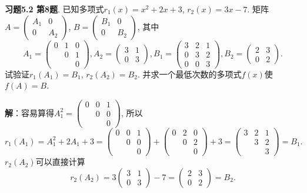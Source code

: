 \newpageorvspace


{\bf 习题5.2 第8题}. 已知多项式$r_1(x) = x^2+2x+3$, $r_2(x) = 3x-7$. 矩阵$A = \begin{pmatrix} A_1 & 0 \\ 0 & A_2 \end{pmatrix}$, $B = \begin{pmatrix} B_1 & 0 \\ 0 & B_2 \end{pmatrix}$, 其中
$$A_1 = \begin{pmatrix} 0 & 1 & 0 \\ & 0 & 1 \\ & & 0 \end{pmatrix}, A_2 = \begin{pmatrix} 3 & 1 \\ 0 & 3 \end{pmatrix}, B_1 = \begin{pmatrix} 3 & 2 & 1 \\ 0 & 3 & 2 \\ 0 & 0 & 3 \end{pmatrix}, B_2 = \begin{pmatrix} 2 & 3 \\ 0 & 2 \end{pmatrix}.$$
试验证$r_1(A_1) = B_1$, $r_2(A_2) = B_2$. 并求一个最低次数的多项式$f(x)$使$f(A) = B$.

{\bf 解}：容易算得$A_1^2 = \begin{pmatrix} 0 & 0 & 1 \\ & 0 & 0 \\ & & 0 \end{pmatrix}$, 所以
$$r_1(A_1) = A_1^2 + 2A_1 + 3 = \begin{pmatrix} 0 & 0 & 1 \\ & 0 & 0 \\ & & 0 \end{pmatrix} + \begin{pmatrix} 0 & 2 & 0 \\ & 0 & 2 \\ & & 0 \end{pmatrix} + 3 = \begin{pmatrix} 3 & 2 & 1 \\ & 3 & 2 \\ & & 3 \end{pmatrix} = B_1.$$
$r_2(A_2)$可以直接计算
$$r_2(A_2) = 3\begin{pmatrix} 3 & 1 \\ 0 & 3 \end{pmatrix} - 7 = \begin{pmatrix} 2 & 3 \\ 0 & 2 \end{pmatrix} = B_2.$$

